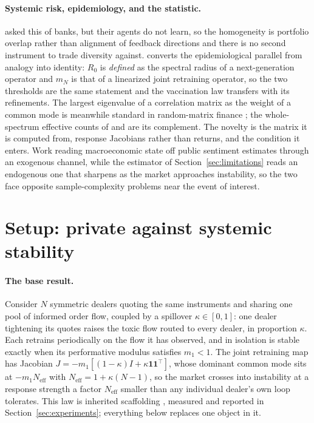 \documentclass{article}
\theoremstyle{plain}
\theoremstyle{definition}
\newcommand{\Neff}{N_{\mathrm{eff}}}
\newcommand{\mN}{m_N}
\begin{document}
\paragraph{Systemic risk, epidemiology, and the statistic.}
\citet{beale2011} asked this of banks, but their agents do not learn, so the homogeneity is portfolio overlap rather than alignment of feedback directions and there is no second instrument to trade diversity against. \citet{diekmann1990} converts the epidemiological parallel from analogy into identity: $R_0$ is \emph{defined} as the spectral radius of a next-generation operator and $\mN$ is that of a linearized joint retraining operator, so the two thresholds are the same statement and the vaccination law transfers with its refinements. The largest eigenvalue of a correlation matrix as the weight of a common mode is meanwhile standard in random-matrix finance \citep{laloux1999,plerou2002}; the whole-spectrum effective counts of \citet{roy2007} and \citet{hill1973} are its complement. The novelty is the matrix it is computed from, response Jacobians rather than returns, and the condition it enters. Work reading macroeconomic state off public sentiment \citep{pebsa2024} estimates through an exogenous channel, while the estimator of Section~\ref{sec:limitations} reads an endogenous one that sharpens as the market approaches instability, so the two face opposite sample-complexity problems near the event of interest.

\section{Setup: private against systemic stability}
\label{sec:setup}

\paragraph{The base result.}
Consider $N$ symmetric dealers quoting the same instruments and sharing one pool of informed order flow, coupled by a spillover $\kappa \in [0,1]$: one dealer tightening its quotes raises the toxic flow routed to every dealer, in proportion $\kappa$. Each retrains periodically on the flow it has observed, and in isolation is stable exactly when its performative modulus satisfies $m_1 < 1$. The joint retraining map has Jacobian $J = -m_1[(1-\kappa)I + \kappa \mathbf{1}\mathbf{1}^{\top}]$, whose dominant common mode sits at $-m_1 \Neff$ with $\Neff = 1+\kappa(N-1)$, so the market crosses into instability at a response strength a factor $\Neff$ smaller than any individual dealer's own loop tolerates. This law is inherited scaffolding \citep{reflex2026}, measured and reported in Section~\ref{sec:experiments}; everything below replaces one object in it.
\end{document}
